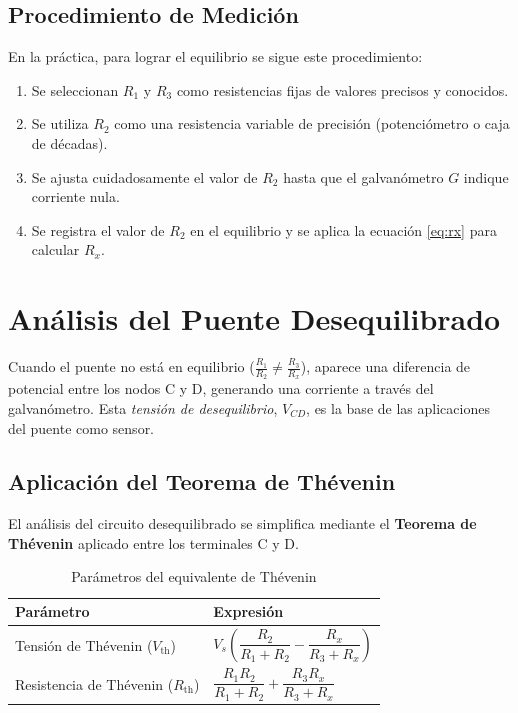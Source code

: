 \documentclass{article}
\begin{document}
\subsection{Procedimiento de Medición}
En la práctica, para lograr el equilibrio se sigue este procedimiento:
\begin{enumerate}
    \item Se seleccionan $R_1$ y $R_3$ como resistencias fijas de valores precisos y conocidos.
    \item Se utiliza $R_2$ como una resistencia variable de precisión (potenciómetro o caja de décadas).
    \item Se ajusta cuidadosamente el valor de $R_2$ hasta que el galvanómetro $G$ indique corriente nula.
    \item Se registra el valor de $R_2$ en el equilibrio y se aplica la ecuación \eqref{eq:rx} para calcular $R_x$.
\end{enumerate}

\section{Análisis del Puente Desequilibrado}

Cuando el puente no está en equilibrio ($\frac{R_1}{R_2} \neq \frac{R_3}{R_x}$), aparece una diferencia de potencial entre los nodos C y D, generando una corriente a través del galvanómetro. Esta \emph{tensión de desequilibrio}, $V_{CD}$, es la base de las aplicaciones del puente como sensor.

\subsection{Aplicación del Teorema de Thévenin}
El análisis del circuito desequilibrado se simplifica mediante el \textbf{Teorema de Thévenin} aplicado entre los terminales C y D.

\begin{table}[H]
    \centering
    \caption{Parámetros del equivalente de Thévenin}
    \begin{tabular}{ll}
        \toprule
        \textbf{Parámetro} & \textbf{Expresión} \\
        \midrule
        Tensión de Thévenin ($V_{\mathrm{th}}$) & $V_s \left( \dfrac{R_2}{R_1 + R_2} - \dfrac{R_x}{R_3 + R_x} \right)$ \\
        \addlinespace
        Resistencia de Thévenin ($R_{\mathrm{th}}$) & $\dfrac{R_1 R_2}{R_1 + R_2} + \dfrac{R_3 R_x}{R_3 + R_x}$ \\
        \bottomrule
    \end{tabular}
    \label{tab:thevenin}
\end{table}
\end{document}
